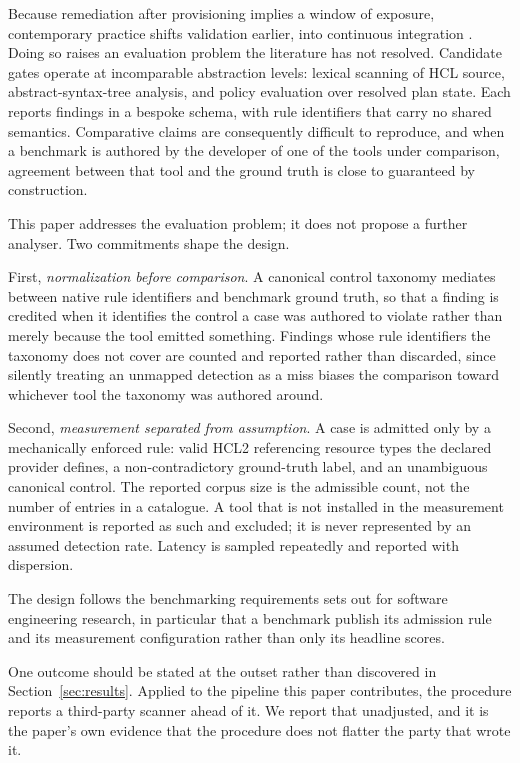 \documentclass[smallextended]{svjour3}
\begin{document}
Because remediation after provisioning implies a window of exposure,
contemporary practice shifts validation earlier, into continuous integration
\citep{bass2015devops, humble2010continuous}. Doing so raises an evaluation
problem the literature has not resolved. Candidate gates operate at incomparable
abstraction levels: lexical scanning of HCL source, abstract-syntax-tree
analysis, and policy evaluation over resolved plan state. Each reports findings
in a bespoke schema, with rule identifiers that carry no shared semantics.
Comparative claims are consequently difficult to reproduce, and when a benchmark
is authored by the developer of one of the tools under comparison, agreement
between that tool and the ground truth is close to guaranteed by construction.

This paper addresses the evaluation problem; it does not propose a further
analyser. Two commitments shape the design.

First, \emph{normalization before comparison}. A canonical control taxonomy
mediates between native rule identifiers and benchmark ground truth, so that a
finding is credited when it identifies the control a case was authored to
violate rather than merely because the tool emitted something. Findings whose
rule identifiers the taxonomy does not cover are counted and reported rather
than discarded, since silently treating an unmapped detection as a miss biases
the comparison toward whichever tool the taxonomy was authored around.

Second, \emph{measurement separated from assumption}. A case is admitted only by
a mechanically enforced rule: valid HCL2 referencing resource types the declared
provider defines, a non-contradictory ground-truth label, and an unambiguous
canonical control. The reported corpus size is the admissible count, not the
number of entries in a catalogue. A tool that is not installed in the measurement
environment is reported as such and excluded; it is never represented by an
assumed detection rate. Latency is sampled repeatedly and reported with
dispersion.

The design follows the benchmarking requirements \citet{hasselbring2021benchmarking}
sets out for software engineering research, in particular that a benchmark
publish its admission rule and its measurement configuration rather than only its
headline scores.

One outcome should be stated at the outset rather than discovered in
Section~\ref{sec:results}. Applied to the pipeline this paper contributes, the
procedure reports a third-party scanner ahead of it. We report that unadjusted,
and it is the paper's own evidence that the procedure does not flatter the party
that wrote it.
\end{document}

